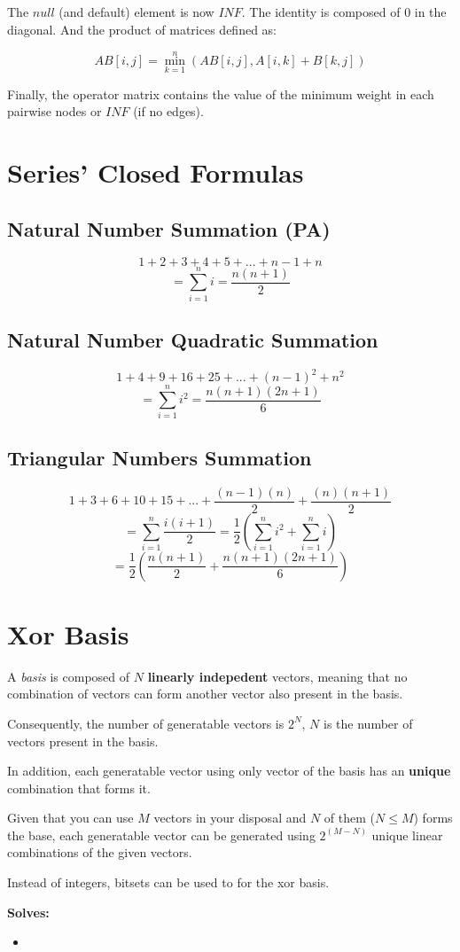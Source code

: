 The $null$ (and default) element is now $INF$. The identity is composed of $0$ in the diagonal.
And the product of matrices defined as:

$$ AB[i, j] = \min^{n}_{k=1} (AB[i, j], A[i,k] + B[k, j]) $$

Finally, the operator matrix contains the value of the minimum weight in each pairwise nodes or $INF$ (if no edges). 

\section{Series' Closed Formulas}

\subsection{Natural Number Summation (PA)}

$$ 1 + 2 + 3 + 4 + 5 + ... + n-1 + n $$
$$ = \sum_{i=1}^n i = \frac{ n(n+1) }{ 2 } $$

\subsection{Natural Number Quadratic Summation}

$$ 1 + 4 + 9 + 16 + 25 + ... + (n-1)^2 + n^2 $$
$$ = \sum_{i=1}^n i^2 = \frac{ n(n+1)(2n+1) }{ 6 } $$

\subsection{Triangular Numbers Summation}

$$ 1 + 3 + 6 + 10 + 15 + ... + \frac{(n-1)(n)}{2} + \frac{(n)(n+1)}{2} $$
$$ = \sum_{i=1}^n \frac{i(i+1)}{2} = \frac{1}{2}(\sum_{i=1}^n i^2 + \sum_{i=1}^n i) $$
$$ = \frac{1}{2} ( \frac{ n(n+1) }{ 2 } + \frac{ n(n+1)(2n+1) }{ 6 }) $$

\section{Xor Basis}

A \textit{basis} is composed of $N$ \textbf{linearly indepedent} vectors, 
meaning that no combination of vectors can form another vector also present in the basis.

Consequently, the number of generatable vectors is $2^N$, $N$ is the number of vectors present in the basis.

In addition, each generatable vector using only vector of the basis has an \textbf{unique} combination that forms it. 

Given that you can use $M$ vectors in your disposal and $N$ of them ($N \leq M$) forms the base, each generatable vector
can be generated using $2^(M-N)$ unique linear combinations of the given vectors.

Instead of integers, bitsets can be used to for the xor basis. 

\textbf{Solves:}

\begin{itemize}
	\item 
\end{itemize}

